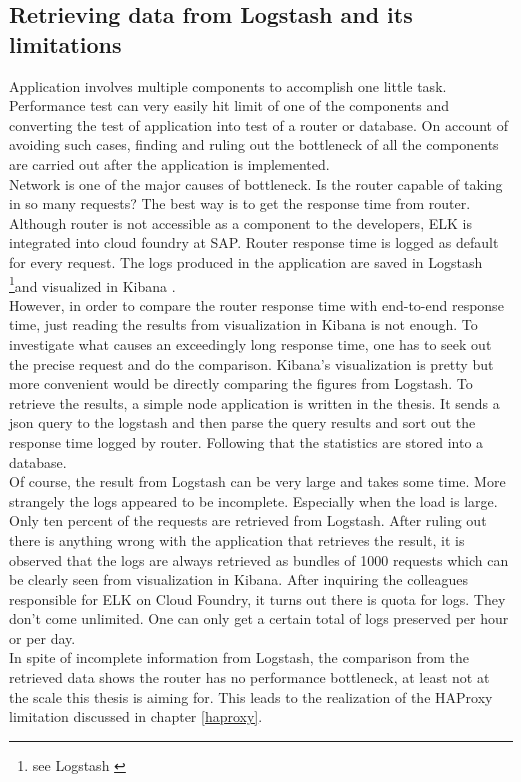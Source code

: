 \subsection{Retrieving data from Logstash and its limitations}
Application involves multiple components to accomplish one little task. Performance test can very easily hit limit of one of the components and converting the test of application into test of a router or database. On account of avoiding such cases, finding and ruling out the bottleneck of all the components are carried out after the application is implemented. \\
Network is one of the major causes of bottleneck. Is the router capable of taking in so many requests? The best way is to get the response time from router. Although router is not accessible as a component to the developers, \ac{ELK} \citep{ELK} is integrated into cloud foundry at SAP. Router response time is logged as default for every request. The logs produced in the application are saved in Logstash \footnote{see Logstash \citep{Logstash}}and visualized in Kibana \citep{Kibana}. \\ 
However, in order to compare the router response time with end-to-end response time, just reading the results from visualization in Kibana is not enough. To investigate what causes an exceedingly long response time, one has to seek out the precise request and do the comparison. Kibana's visualization is pretty but more convenient would be directly comparing the figures from Logstash. To retrieve the results, a simple node application is written in the thesis. It sends a json query to the logstash and then parse the query results and sort out the response time logged by router. Following that the statistics are stored into a database.\\
Of course, the result from Logstash can be very large and takes some time. More strangely the logs appeared to be incomplete. Especially when the load is large. Only ten percent of the requests are retrieved from Logstash. After ruling out there is anything wrong with the application that retrieves the result, it is observed that the logs are always retrieved as bundles of 1000 requests which can be clearly seen from visualization in Kibana. After inquiring the colleagues responsible for ELK on Cloud Foundry,  it turns out there is quota for logs. They don't come unlimited. One can only get a certain total of logs preserved per hour or per day.\\
In spite of incomplete information from Logstash, the comparison from the retrieved data shows the router has no performance bottleneck, at least not at the scale this thesis is aiming for. This leads to the realization of the HAProxy limitation discussed in chapter \ref{haproxy}. 

